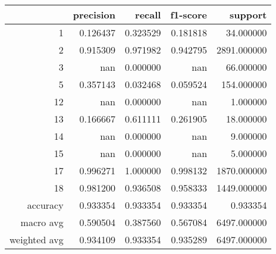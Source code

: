 \begin{tabular}{rrrrr}
\toprule
 & precision & recall & f1-score & support \\
\midrule
1 & 0.126437 & 0.323529 & 0.181818 & 34.000000 \\
2 & 0.915309 & 0.971982 & 0.942795 & 2891.000000 \\
3 & nan & 0.000000 & nan & 66.000000 \\
5 & 0.357143 & 0.032468 & 0.059524 & 154.000000 \\
12 & nan & 0.000000 & nan & 1.000000 \\
13 & 0.166667 & 0.611111 & 0.261905 & 18.000000 \\
14 & nan & 0.000000 & nan & 9.000000 \\
15 & nan & 0.000000 & nan & 5.000000 \\
17 & 0.996271 & 1.000000 & 0.998132 & 1870.000000 \\
18 & 0.981200 & 0.936508 & 0.958333 & 1449.000000 \\
accuracy & 0.933354 & 0.933354 & 0.933354 & 0.933354 \\
macro avg & 0.590504 & 0.387560 & 0.567084 & 6497.000000 \\
weighted avg & 0.934109 & 0.933354 & 0.935289 & 6497.000000 \\
\bottomrule
\end{tabular}
